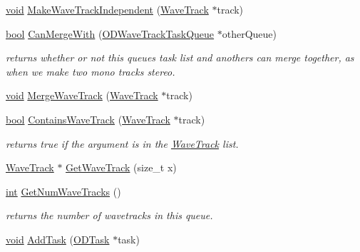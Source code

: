 \begin{DoxyCompactItemize}
\hyperlink{sound_8c_ae35f5844602719cf66324f4de2a658b3}{void} \hyperlink{class_o_d_wave_track_task_queue_a9ef490dcacef826900911fe6f806cbfe}{Make\+Wave\+Track\+Independent} (\hyperlink{class_wave_track}{Wave\+Track} $\ast$track)
\item 
\hyperlink{mac_2config_2i386_2lib-src_2libsoxr_2soxr-config_8h_abb452686968e48b67397da5f97445f5b}{bool} \hyperlink{class_o_d_wave_track_task_queue_a185407f037927f2384ae40910bd93378}{Can\+Merge\+With} (\hyperlink{class_o_d_wave_track_task_queue}{O\+D\+Wave\+Track\+Task\+Queue} $\ast$other\+Queue)
\begin{DoxyCompactList}\small\item\em returns whether or not this queue\textquotesingle{}s task list and another\textquotesingle{}s can merge together, as when we make two mono tracks stereo. \end{DoxyCompactList}\item 
\hyperlink{sound_8c_ae35f5844602719cf66324f4de2a658b3}{void} \hyperlink{class_o_d_wave_track_task_queue_aca1351c9096298368e022c997ee734b4}{Merge\+Wave\+Track} (\hyperlink{class_wave_track}{Wave\+Track} $\ast$track)
\item 
\hyperlink{mac_2config_2i386_2lib-src_2libsoxr_2soxr-config_8h_abb452686968e48b67397da5f97445f5b}{bool} \hyperlink{class_o_d_wave_track_task_queue_a59f5152239f913ea545b3347c7ebb97b}{Contains\+Wave\+Track} (\hyperlink{class_wave_track}{Wave\+Track} $\ast$track)
\begin{DoxyCompactList}\small\item\em returns true if the argument is in the \hyperlink{class_wave_track}{Wave\+Track} list. \end{DoxyCompactList}\item 
\hyperlink{class_wave_track}{Wave\+Track} $\ast$ \hyperlink{class_o_d_wave_track_task_queue_a09b6539f4a8cb0388291d20f521b9cfe}{Get\+Wave\+Track} (size\+\_\+t x)
\item 
\hyperlink{xmltok_8h_a5a0d4a5641ce434f1d23533f2b2e6653}{int} \hyperlink{class_o_d_wave_track_task_queue_acdff21bd79058284dc516f78e44703f6}{Get\+Num\+Wave\+Tracks} ()
\begin{DoxyCompactList}\small\item\em returns the number of wavetracks in this queue. \end{DoxyCompactList}\item 
\hyperlink{sound_8c_ae35f5844602719cf66324f4de2a658b3}{void} \hyperlink{class_o_d_wave_track_task_queue_a583badb4082706b53f635022e7bcb4c5}{Add\+Task} (\hyperlink{class_o_d_task}{O\+D\+Task} $\ast$task)

\end{DoxyCompactItemize}
